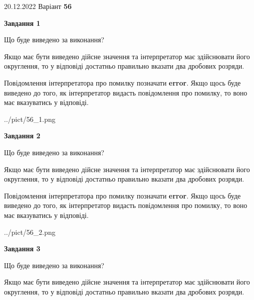 \documentclass[12pt, ukrainian]{article}
\begin{document}
{20.12.2022 Варіант \No \textbf { 56 }\par}
{
\begin {Large}

{\begin {center}\textbf{Завдання 1}\end {center}}\par
Що буде виведено за виконання? \par

Якщо має бути виведено дійсне значення та інтерпретатор має здійснювати його округлення, 
то у відповіді достатньо правильно вказати два дробових розряди.

Повідомлення інтерпретатора про помилку позначати \textbf{error}.
Якщо щось буде виведено до того, як інтерпретатор видасть повідомлення про помилку, 
то воно має вказуватись у відповіді. \par

\begin{center}
	{../pict/56_1.png}
\end{center}
\newpage

{\begin {center}\textbf{Завдання 2}\end {center}}\par
Що буде виведено за виконання? \par

Якщо має бути виведено дійсне значення та інтерпретатор має здійснювати його округлення, 
то у відповіді достатньо правильно вказати два дробових розряди.

Повідомлення інтерпретатора про помилку позначати \textbf{error}.
Якщо щось буде виведено до того, як інтерпретатор видасть повідомлення про помилку, 
то воно має вказуватись у відповіді. \par

\begin{center}
	{../pict/56_2.png}
\end{center}
\newpage

{\begin {center}\textbf{Завдання 3}\end {center}}\par
Що буде виведено за виконання? \par

Якщо має бути виведено дійсне значення та інтерпретатор має здійснювати його округлення, 
то у відповіді достатньо правильно вказати два дробових розряди.


\end{Large}}
\end{document}

